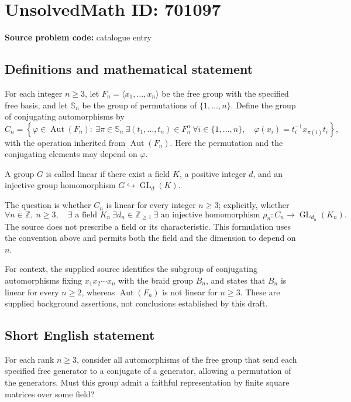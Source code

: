 \documentclass[11pt]{article}
\newcommand{\Z}{\mathbb{Z}}
\begin{document}
\section*{UnsolvedMath ID: 701097}
\textbf{Source problem code:} catalogue entry
\subsection{Definitions and mathematical statement}
For each integer \(n\geq 3\), let \(F_n=\langle x_1,\ldots,x_n\rangle\) be the free group with the specified free basis, and let \(\mathbb S_n\) be the group of permutations of \(\{1,\ldots,n\}\). Define the group of conjugating automorphisms by
\[
C_n=\left\{\varphi\in\operatorname{Aut}(F_n):\ \exists\pi\in\mathbb S_n\ \exists(t_1,\ldots,t_n)\in F_n^n\ \forall i\in\{1,\ldots,n\},\quad \varphi(x_i)=t_i^{-1}x_{\pi(i)}t_i\right\},
\]
with the operation inherited from \(\operatorname{Aut}(F_n)\). Here the permutation and the conjugating elements may depend on \(\varphi\).

A group \(G\) is called linear if there exist a field \(K\), a positive integer \(d\), and an injective group homomorphism \(G\hookrightarrow\operatorname{GL}_d(K)\).

The question is whether \(C_n\) is linear for every integer \(n\geq 3\); explicitly, whether
\[
\forall n\in\Z,\ n\geq 3,\quad \exists\text{ a field }K_n\ \exists d_n\in\Z_{\geq 1}\ \exists\text{ an injective homomorphism }\rho_n:C_n\longrightarrow\operatorname{GL}_{d_n}(K_n).
\]
The source does not prescribe a field or its characteristic. This formulation uses the convention above and permits both the field and the dimension to depend on \(n\).

For context, the supplied source identifies the subgroup of conjugating automorphisms fixing \(x_1x_2\cdots x_n\) with the braid group \(B_n\), and states that \(B_n\) is linear for every \(n\geq 2\), whereas \(\operatorname{Aut}(F_n)\) is not linear for \(n\geq 3\). These are supplied background assertions, not conclusions established by this draft.
\subsection{Short English statement}
For each rank \(n\geq 3\), consider all automorphisms of the free group that send each specified free generator to a conjugate of a generator, allowing a permutation of the generators. Must this group admit a faithful representation by finite square matrices over some field?
\end{document}
